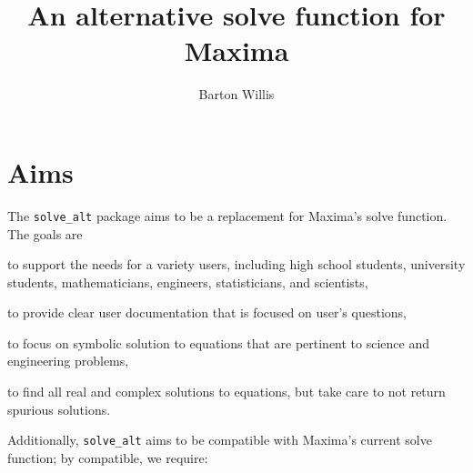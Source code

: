 \documentclass[]{article}%
\title{An alternative solve function for Maxima}
\author{Barton Willis}
\newcommand{\altsolve}{\texttt{solve\_alt}}
\begin{document}
\maketitle

\section{Aims}

The \altsolve\/ package aims to be a replacement for Maxima's solve function. The goals are

\begin{alphalist}[noitemsep]

\item to support the needs for a variety users, including high school students, university students, mathematicians, engineers, statisticians, and scientists,

\item to provide clear user documentation that is focused on user's questions,

\item to focus on symbolic solution to equations that are pertinent to science and engineering problems,


\item to find all real and complex solutions to equations, but take care to not return spurious solutions.

\end{alphalist}
Additionally, \altsolve\/  aims to be compatible with Maxima's current solve function; by compatible, we require:
\end{document}
